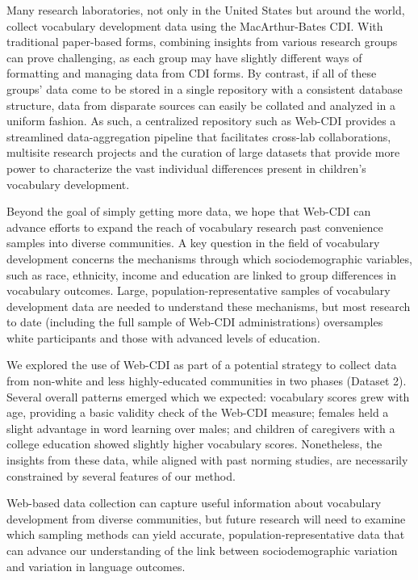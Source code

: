 \documentclass[
  english,
  ,man,floatsintext]{apa6}
\begin{document}
Many research laboratories, not only in the United States but around the world, collect vocabulary development data using the MacArthur-Bates CDI. With traditional paper-based forms, combining insights from various research groups can prove challenging, as each group may have slightly different ways of formatting and managing data from CDI forms. By contrast, if all of these groups' data come to be stored in a single repository with a consistent database structure, data from disparate sources can easily be collated and analyzed in a uniform fashion. As such, a centralized repository such as Web-CDI provides a streamlined data-aggregation pipeline that facilitates cross-lab collaborations, multisite research projects and the curation of large datasets that provide more power to characterize the vast individual differences present in children's vocabulary development.

Beyond the goal of simply getting more data, we hope that Web-CDI can advance efforts to expand the reach of vocabulary research past convenience samples into diverse communities. A key question in the field of vocabulary development concerns the mechanisms through which sociodemographic variables, such as race, ethnicity, income and education are linked to group differences in vocabulary outcomes. Large, population-representative samples of vocabulary development data are needed to understand these mechanisms, but most research to date (including the full sample of Web-CDI administrations) oversamples white participants and those with advanced levels of education.

We explored the use of Web-CDI as part of a potential strategy to collect data from non-white and less highly-educated communities in two phases (Dataset 2). Several overall patterns emerged which we expected: vocabulary scores grew with age, providing a basic validity check of the Web-CDI measure; females held a slight advantage in word learning over males; and children of caregivers with a college education showed slightly higher vocabulary scores. Nonetheless, the insights from these data, while aligned with past norming studies, are necessarily constrained by several features of our method.

Web-based data collection can capture useful information about vocabulary development from diverse communities, but future research will need to examine which sampling methods can yield accurate, population-representative data that can advance our understanding of the link between sociodemographic variation and variation in language outcomes.
\end{document}
